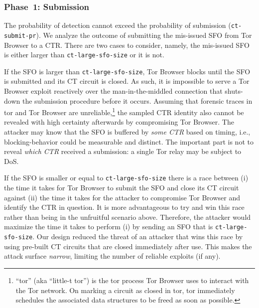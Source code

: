 
\subsubsection{Phase~1: Submission} \label{sec:analysis:pr:phase1} 
The probability of detection cannot exceed the probability of submission
(\texttt{ct-submit-pr}). We analyze the outcome of submitting the mis-issued
SFO from Tor Browser to a CTR\@.  There are two cases to consider, namely, the
mis-issued SFO is either larger than \texttt{ct-large-sfo-size} or it is not.

If the SFO is larger than \texttt{ct-large-sfo-size}, Tor Browser blocks until
the SFO is submitted and its CT circuit is closed.  As such, it is impossible to
serve a Tor Browser exploit reactively over the man-in-the-middled connection
that shuts-down the submission procedure before it occurs.  Assuming that
forensic traces in tor and Tor Browser are unreliable,\footnote{%
	``tor'' (aka ``little-t tor'') is the tor process Tor Browser uses to
	interact with the Tor network.  On marking a circuit as closed in tor, tor
	immediately schedules the associated data structures to be freed as soon as
	possible.
} the sampled CTR identity also cannot be revealed with high certainty
afterwards by compromising Tor Browser.  The attacker may know that the SFO is
buffered by \emph{some CTR} based on timing, i.e., blocking-behavior could be 
measurable and distinct.  The important part is not to reveal \emph{which CTR}
received a submission:  a single Tor relay may be subject to DoS.

If the SFO is smaller or equal to \texttt{ct-large-sfo-size} there is a
race between (i) the time it takes for Tor Browser to submit the SFO and close
its CT circuit against (ii) the time it takes for the attacker to compromise Tor
Browser and identify the CTR in question.  It is more advantageous to try and
win this race rather than being in the unfruitful scenario above.  Therefore,
the attacker would maximize the time it takes to perform (i) by sending an SFO
that is \texttt{ct-large-sfo-size}.  Our design reduced the threat of an
attacker that wins this race by using pre-built CT circuits that are closed
immediately after use.  This makes the attack surface \emph{narrow}, limiting
the number of reliable exploits (if any).

